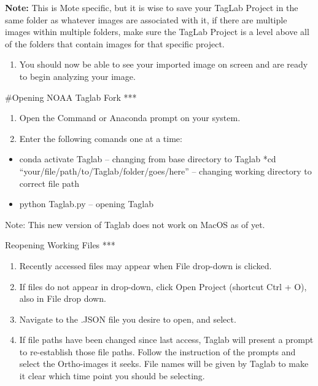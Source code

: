 \documentclass[
]{article}
\providecommand{\tightlist}{%
  \setlength{\itemsep}{0pt}\setlength{\parskip}{0pt}}
\begin{document}
\textbf{Note:} This is Mote specific, but it is wise to save your TagLab
Project in the same folder as whatever images are associated with it, if
there are multiple images within multiple folders, make sure the TagLab
Project is a level above all of the folders that contain images for that
specific project.

\begin{enumerate}
\def\labelenumi{\arabic{enumi}.}
\setcounter{enumi}{6}
\tightlist
\item
  You should now be able to see your imported image on screen and are
  ready to begin analyzing your image.
\end{enumerate}

\#Opening NOAA Taglab Fork ***

\begin{enumerate}
\def\labelenumi{\arabic{enumi}.}
\item
  Open the Command or Anaconda prompt on your system.
\item
  Enter the following comands one at a time:
\end{enumerate}

\begin{itemize}
\tightlist
\item
  conda activate Taglab -- changing from base directory to Taglab *cd
  ``your/file/path/to/Taglab/folder/goes/here'' -- changing working
  directory to correct file path
\item
  python Taglab.py -- opening Taglab
\end{itemize}

Note: This new version of Taglab does not work on MacOS as of yet.

Reopening Working Files ***

\begin{enumerate}
\def\labelenumi{\arabic{enumi}.}
\item
  Recently accessed files may appear when File drop-down is clicked.
\item
  If files do not appear in drop-down, click Open Project (shortcut Ctrl
  + O), also in File drop down.
\item
  Navigate to the .JSON file you desire to open, and select.
\item
  If file paths have been changed since last access, Taglab will present
  a prompt to re-establish those file paths. Follow the instruction of
  the prompts and select the Ortho-images it seeks. File names will be
  given by Taglab to make it clear which time point you should be
  selecting.
\end{enumerate}
\end{document}
